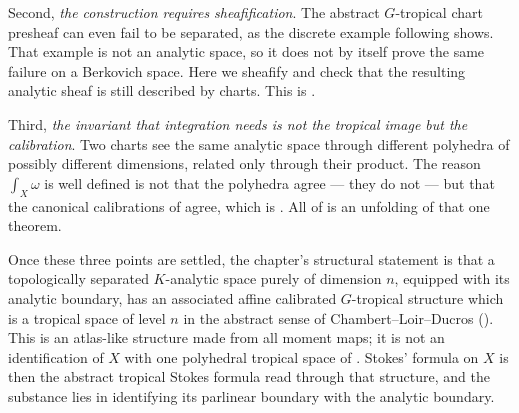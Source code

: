 Second, \emph{the construction requires sheafification}.  The abstract
$G$-tropical chart presheaf can even fail to be separated, as the discrete
example following  shows.  That example is not an
analytic space, so it does not by itself prove the same failure on a
Berkovich space.  Here we sheafify and check that the resulting analytic
sheaf is still described by charts.  This is .

Third, \emph{the invariant that integration needs is not the tropical image
but the calibration}.  Two charts see the same analytic space through
different polyhedra of possibly different dimensions, related only through
their product.  The reason $\int_X\omega$ is well defined is not that the
polyhedra agree --- they do not --- but that the canonical calibrations of
 agree, which is
.  All of
 is an unfolding of that one
theorem.

Once these three points are settled, the chapter's structural statement is
that a topologically separated $K$-analytic space purely of dimension $n$,
equipped with its analytic boundary, has an associated affine calibrated
$G$-tropical structure which is a tropical space of level $n$ in the abstract
sense of Chambert--Loir--Ducros
().  This is an atlas-like structure made
from all moment maps; it is not an identification of $X$ with one polyhedral
tropical space of .  Stokes' formula on $X$ is then
the abstract tropical Stokes formula  read through
that structure, and the substance lies in identifying its parlinear boundary
with the analytic boundary.


